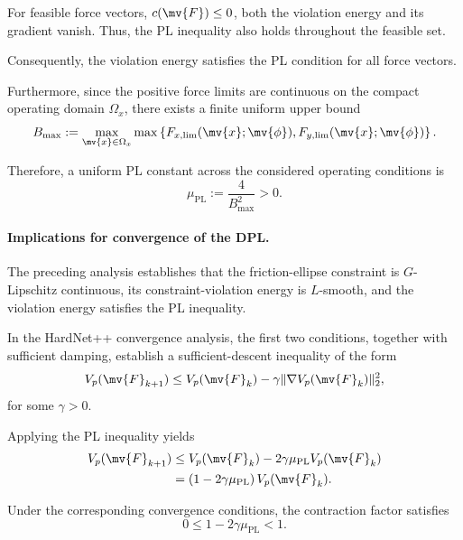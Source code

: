 For feasible force vectors, $c(\mv{F})\leq0$, both the violation energy and its
gradient vanish. Thus, the PL inequality also holds throughout the feasible
set.

Consequently, the violation energy satisfies the PL condition for all force
vectors.

Furthermore, since the positive force limits are continuous on the compact
operating domain $\Omega_x$, there exists a finite uniform upper bound
\begin{equation}
	B_{\max}
	:=
	\max_{\mv{x}\in\Omega_x}
	\max
	\left\{
	F_{x,\lim}(\mv{x};\mv{\phi}),
	F_{y,\lim}(\mv{x};\mv{\phi})
	\right\}
	.
\end{equation}

Therefore, a uniform PL constant across the considered operating conditions is
\begin{equation}
	\mu_{\mathrm{PL}}
	:=
	\frac{4}{B_{\max}^2}
	>0
	.
\end{equation}

\paragraph{Implications for convergence of the DPL.}

The preceding analysis establishes that the friction-ellipse constraint is
$G$-Lipschitz continuous, its constraint-violation energy is $L$-smooth, and
the violation energy satisfies the PL inequality.

In the HardNet++ convergence analysis, the first two conditions, together with
sufficient damping, establish a sufficient-descent inequality of the form
\begin{equation}
	\label{Tire:eq:dpl:sufficient:descent}
	V_p(\mv{F}_{k+1})
	\leq
	V_p(\mv{F}_k)
	-
	\gamma
	\|\nabla V_p(\mv{F}_k)\|_2^2
	,
\end{equation}
for some $\gamma>0$.

Applying the PL inequality yields
\begin{equation}
	\begin{aligned}
		V_p(\mv{F}_{k+1})
		 & \leq
		V_p(\mv{F}_k)
		-
		2\gamma\mu_{\mathrm{PL}}
		V_p(\mv{F}_k)
		\\
		 & =
		\left(
		1-2\gamma\mu_{\mathrm{PL}}
		\right)
		V_p(\mv{F}_k)
		.
	\end{aligned}
\end{equation}

Under the corresponding convergence conditions, the contraction factor
satisfies
\begin{equation}
	0
	\leq
	1-2\gamma\mu_{\mathrm{PL}}
	<
	1
	.
\end{equation}

